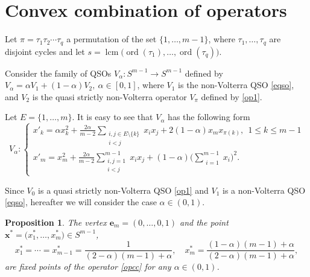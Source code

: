 \documentclass[11pt,reqno]{amsart}
\newtheorem{proposition}[subsection]{Proposition}
\numberwithin{equation}{section} \setcounter{tocdepth}{1}
\DeclareMathOperator{\lcm}{lcm}
\DeclareMathOperator{\ord}{ord}
\begin{document}
\section{Convex combination of operators}
\label{sec:convexcombination}


Let $\pi=\tau_1\tau_2\cdots\tau_q$ a permutation of the set $\{1,\dots,m-1\}$, where $\tau_1,\dots,\tau_q$ are disjoint cycles and
let $s=\lcm \big(\ord (\tau_1),\dots, \ord (\tau_q)\big)$.

Consider the family of QSOs $V_\alpha \colon S^{m-1}\to S^{m-1}$ defined by
$V_\alpha = \alpha V_1 + (1 -\alpha)V_2, \  \alpha \in [0, 1]$,  where
$V_1$ is the non-Volterra QSO \eqref{eqso},  and  $V_2$ is the quasi strictly non-Volterra operator
$V_\pi$ defined by \eqref{op1}.



Let $E=\{1,\dots,m\}$. It is easy to see that $V_\alpha$ has the following form
\begin{equation}\label{opcc}
V_\alpha: \left\{\begin{array}{lll}
               x'_{k}= \alpha x_k^2 +
               \frac{2\alpha}{m-2}\displaystyle\sum_{\substack{i,j\in E\setminus\{k\}\\ i<j}} x_ix_j + 2(1-\alpha)x_m x_{\pi(k)}, \ \ 1\leq k\leq m-1\\[5mm]
               x'_{m}= x_m^2+
               \frac{2\alpha}{m-2}\displaystyle\sum_{\substack{i,j=1\\ i<j}}^{m-1} x_ix_j +
               (1-\alpha) \Big(\displaystyle\sum_{\substack{i=1}}^{m-1} x_i\Big)^2.
\end{array}\right.
\end{equation}

Since $V_0$ is a quasi strictly non-Volterra QSO \eqref{op1}  and $V_1$ is a non-Volterra QSO \eqref{eqso}, hereafter we will  consider the case $\alpha\in (0,1)$.

\begin{proposition} The vertex $\mathbf{e}_m=(0,\dots,0,1)$ and the point $\mathbf{x}^*=\big(x_1^*,\dots, x_m^*\big)\in S^{m-1}$, \[x_1^*=\cdots=x_{m-1}^* =\frac{1}{ (2-\alpha)(m-1)+\alpha}, \quad x_m^*=\frac{(1-\alpha)(m-1)+\alpha}{ (2-\alpha)(m-1)+\alpha},\]
 are fixed points of  the operator \eqref{opcc} for any $\alpha\in (0,1)$.
\end{proposition}
\end{document}
